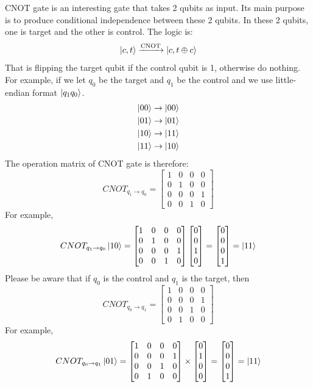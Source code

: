 \documentclass[12pt]{article}
\numberwithin{equation}{section}  %
\theoremstyle{definition}
\theoremstyle{plain}
\theoremstyle{remark}
\begin{document}
CNOT gate is an interesting gate that takes 2 qubits as input. Its main purpose is to produce conditional independence between these 2 qubits. In these 2 qubits, one is target and the other is control. The logic is:
\[\ket{c,t}\xrightarrow{\text{CNOT}}\ket{c,t\oplus c}\]
That is flipping the target qubit if the control qubit is 1, otherwise do nothing. For example, if we let $q_0$ be the target and $q_1$ be the control and we use little-endian format $\ket{q_1q_0}$. 
\[\begin{aligned}
    \ket{00}\rightarrow\ket{00}\\
    \ket{01}\rightarrow\ket{01}\\
    \ket{10}\rightarrow\ket{11}\\
    \ket{11}\rightarrow\ket{10}
\end{aligned}\]
The operation matrix of CNOT gate is therefore:
\[CNOT_{q_1\rightarrow q_0}=\begin{bmatrix}
    1&0&0&0\\0&1&0&0\\0&0&0&1\\0&0&1&0
\end{bmatrix}\]
For example,
\[CNOT_{q_1\rightarrow q_0}\ket{10}=\begin{bmatrix}1&0&0&0\\0&1&0&0\\0&0&0&1\\0&0&1&0\end{bmatrix}\begin{bmatrix}0\\0\\1\\0\end{bmatrix}
=\begin{bmatrix}0\\0\\0\\1\end{bmatrix}=\ket{11}\]
Please be aware that if $q_0$ is the control and $q_1$ is the target, then
\[CNOT_{q_0\rightarrow q_1}=\begin{bmatrix}
    1&0&0&0\\0&0&0&1\\0&0&1&0\\0&1&0&0
\end{bmatrix}\]
For example, 
\begin{equation*}
    CNOT_{q_0\rightarrow q_1}\ket{01}=\begin{bmatrix}
    1&0&0&0\\0&0&0&1\\0&0&1&0\\0&1&0&0\end{bmatrix}\times\begin{bmatrix}0\\1\\0\\0\end{bmatrix}=
    \begin{bmatrix}0\\0\\0\\1\end{bmatrix}=\ket{11}
\end{equation*}
\end{document}
